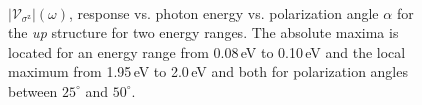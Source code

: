 \documentclass[prb,11pt,tightenlines,twocolumn,aps]{revtex4-1}
\begin{document}
\begin{figure}[t]
    \centering
    \\

    \caption{$|\mathcal{V}_{\sigma^{\mathrm{z}}}|(\omega)$, response
    vs. photon energy vs. polarization angle $\alpha$ for the \emph{up}
    structure for two energy ranges. The absolute maxima is located for an
    energy range from 0.08\,eV to 0.10\,eV and the local maximum from 1.95\,eV
    to 2.0\,eV and both for polarization angles between $25^{\circ}$ and
    $50^{\circ}$.}
    \label{fig:up-3d-vsz}
\end{figure}
\end{document}
